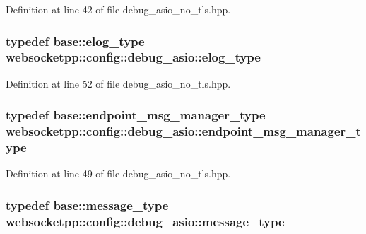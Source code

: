 Definition at line 42 of file debug\+\_\+asio\+\_\+no\+\_\+tls.\+hpp.

\hypertarget{structwebsocketpp_1_1config_1_1debug__asio_a05c9a14cdc8cab4614caebf24a409364}{}
\subsubsection[{elog\+\_\+type}]{\setlength{\rightskip}{0pt plus 5cm}typedef {\bf base\+::elog\+\_\+type} {\bf websocketpp\+::config\+::debug\+\_\+asio\+::elog\+\_\+type}}\label{structwebsocketpp_1_1config_1_1debug__asio_a05c9a14cdc8cab4614caebf24a409364}


Definition at line 52 of file debug\+\_\+asio\+\_\+no\+\_\+tls.\+hpp.

\hypertarget{structwebsocketpp_1_1config_1_1debug__asio_a55481a7cdef8ea9aef21c4498abf5544}{}
\subsubsection[{endpoint\+\_\+msg\+\_\+manager\+\_\+type}]{\setlength{\rightskip}{0pt plus 5cm}typedef {\bf base\+::endpoint\+\_\+msg\+\_\+manager\+\_\+type} {\bf websocketpp\+::config\+::debug\+\_\+asio\+::endpoint\+\_\+msg\+\_\+manager\+\_\+type}}\label{structwebsocketpp_1_1config_1_1debug__asio_a55481a7cdef8ea9aef21c4498abf5544}


Definition at line 49 of file debug\+\_\+asio\+\_\+no\+\_\+tls.\+hpp.

\hypertarget{structwebsocketpp_1_1config_1_1debug__asio_aaf34fbc85d12c93050cb41bc5c4cdbda}{}
\subsubsection[{message\+\_\+type}]{\setlength{\rightskip}{0pt plus 5cm}typedef {\bf base\+::message\+\_\+type} {\bf websocketpp\+::config\+::debug\+\_\+asio\+::message\+\_\+type}}\label{structwebsocketpp_1_1config_1_1debug__asio_aaf34fbc85d12c93050cb41bc5c4cdbda}


